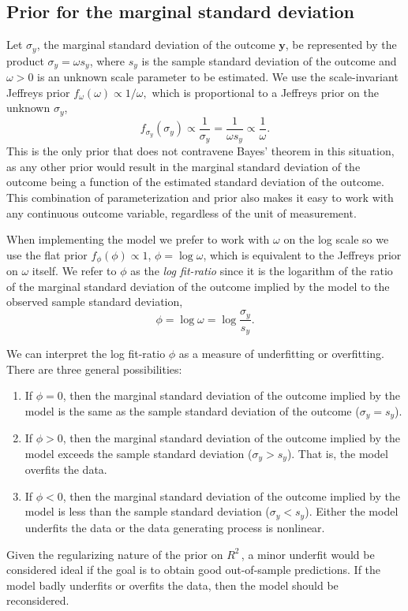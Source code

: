 \documentclass[11pt]{article}
\newcommand{\Rsq}{$R^2\,$}
\newcommand{\y}{\mathbf{y}}
\begin{document}
\subsection{Prior for the marginal standard deviation}
\label{subsec:marginalSD}
Let $\sigma_y$, the marginal standard deviation of the outcome $\y$, be
represented by the product $\sigma_y = \omega s_y$, where $s_y$ is the sample
standard deviation of the outcome and $\omega > 0$ is an unknown scale parameter
to be estimated. We use the scale-invariant Jeffreys prior
$f_\omega \left(\omega\right) \propto 1 / \omega,$
which is proportional to a Jeffreys prior on the unknown $\sigma_y$,
$$f_{\sigma_y} \left(\sigma_y\right) \propto \frac{1}{\sigma_y}
= \frac{1}{\omega s_y} \propto \frac{1}{\omega}.$$
This is the only prior that does not contravene Bayes' theorem in this
situation, as any other prior would result in the marginal standard deviation of
the outcome being a function of the estimated standard deviation of the outcome.
This combination of parameterization and prior also makes it easy to work with
any continuous outcome variable, regardless of the unit of measurement.

When implementing the model we prefer to work with $\omega$ on the log scale so
we use the flat prior $f_\phi(\phi) \propto 1$, $\phi = \log{\omega}$, which is
equivalent to the Jeffreys prior on $\omega$ itself. We refer to $\phi$ as the
\emph{log fit-ratio} since it is the logarithm of the ratio of the marginal
standard deviation of the outcome implied by the model to the observed sample
standard deviation,
%
$$\phi = \log{\omega} = \log{\frac{\sigma_y}{s_y}}.$$

We can interpret the log fit-ratio $\phi$ as a measure of underfitting or
overfitting. There are three general possibilities:

\begin{enumerate}
\item If $\phi = 0$, then the marginal standard deviation of
the outcome implied by the model is the same as the sample standard deviation of
the outcome  ($\sigma_y = s_y$).
\item If $\phi > 0$, then the marginal standard deviation of the outcome implied
by the model exceeds the sample standard deviation ($\sigma_y > s_y$). That is,
the model overfits the data.
\item If $\phi < 0$, then the marginal standard deviation of the outcome implied
by the model is less than the sample standard deviation  ($\sigma_y < s_y$).
Either the model underfits the data or the data generating process is nonlinear.
\end{enumerate}
%
Given the regularizing nature of the prior on \Rsq, a minor underfit would be
considered ideal if the goal is to obtain good out-of-sample predictions. If the
model badly underfits or overfits the data, then the model should be
reconsidered.
\end{document}

